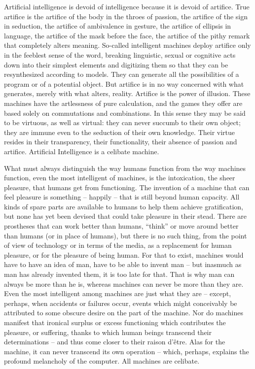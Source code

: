 \documentclass[10pt,twoside,openleft]{memoir}
\begin{document}
Artificial intelligence is devoid of intelligence because it is devoid of artifice. True artifice is the artifice of the body in the throes of passion, the artifice of the sign in seduction, the artifice of ambivalence in gesture, the artifice of ellipsis in language, the artifice of the mask before the face, the artifice of the pithy remark that completely alters meaning. So-called intelligent machines deploy artifice only in the feeblest sense of the word, breaking linguistic, sexual or cognitive acts down into their simplest elements and digitizing them so that they can be resynthesized according to models. They can generate all the possibilities of a program or of a potential object. But artifice is in no way concerned with what generates, merely with what alters, reality. Artifice is the power of illusion. These machines have the artlessness of pure calculation, and the games they offer are based solely on commutations and combinations. In this sense they may be said to be virtuous, as well as virtual: they can never succumb to their own object; they are immune even to the seduction of their own knowledge. Their virtue resides in their transparency, their functionality, their absence of passion and artifice. Artificial Intelligence is a celibate machine. 

What must always distinguish the way humans function from the way machines function, even the most intelligent of machines, is the intoxication, the sheer pleasure, that humans get from functioning. The invention of a machine that can feel pleasure is something -- happily -- that is still beyond human capacity. All kinds of spare parts are available to humans to help them achieve gratification, but none has yet been devised that could take pleasure in their stead. There are prostheses that can work better than humans, ``think'' or move around better than humans (or in place of humans), but there is no such thing, from the point of view of technology or in terms of the media, as a replacement for human pleasure, or for the pleasure of being human. For that to exist, machines would have to have an idea of man, have to be able to invent man -- but inasmuch as man has already invented them, it is too late for that. That is why man can always be more than he is, whereas machines can never be more than they are. Even the most intelligent among machines are just what they are -- except, perhaps, when accidents or failures occur, events which might conceivably be attributed to some obscure desire on the part of the machine. Nor do machines manifest that ironical surplus or excess functioning which contributes the pleasure, or suffering, thanks to which human beings transcend their determinations -- and thus come closer to their raison d'\^etre. Alas for the machine, it can never transcend its own operation -- which, perhaps, explains the profound melancholy of the computer. All machines are celibate. 
\end{document}
